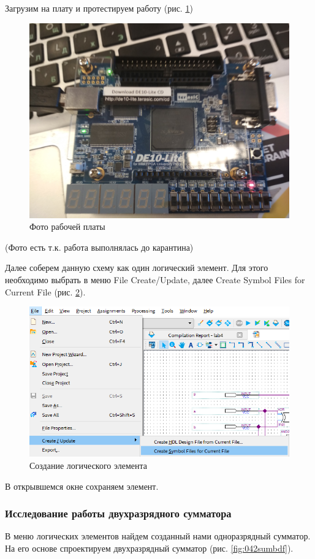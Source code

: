 \documentclass[a4paper,14pt]{article}
\begin{document}
 Загрузим на плату и протестируем работу (рис. \ref{fig:041foto})
 
 \begin{figure}[H]
 	\centering
 	\includegraphics[width=0.7\linewidth]{image/lab4/2020-03-1412-17-02.JPG}
 	\caption{Фото рабочей платы}
 	\label{fig:041foto}
 \end{figure}

(Фото есть т.к. работа выполнялась до карантина)

Далее соберем данную схему как один логический элемент. Для этого необходимо выбрать в меню File Create/Update, далее Create Symbol Files for Current File (рис. \ref{fig:04createsymbol}).

\begin{figure}[H]
	\centering
	\includegraphics[width=0.7\linewidth]{image/04_create_symbol}
	\caption{Создание логического элемента}
	\label{fig:04createsymbol}
\end{figure}

В открывшемся окне сохраняем элемент.

\subsubsection{Исследование работы двухразрядного сумматора}

В меню логических элементов найдем созданный нами одноразрядный сумматор. На его основе спроектируем двухразрядный сумматор (рис. \ref{fig:042sumbdf}).
\end{document}
